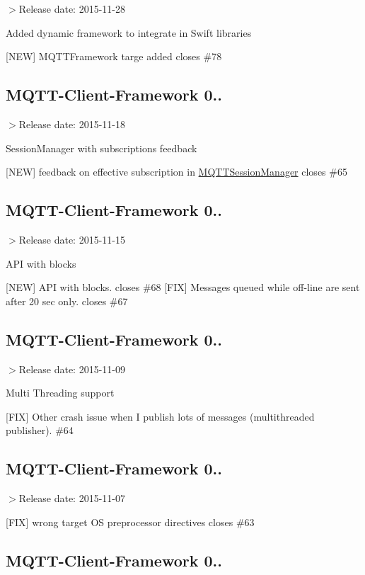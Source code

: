 $>$Release date\+: 2015-\/11-\/28

Added dynamic framework to integrate in Swift libraries

\mbox{[}N\+EW\mbox{]} M\+Q\+T\+T\+Framework targe added closes \#78

\subsection*{M\+Q\+T\+T-\/\+Client-\/\+Framework 0..}

$>$Release date\+: 2015-\/11-\/18

Session\+Manager with subscriptions feedback

\mbox{[}N\+EW\mbox{]} feedback on effective subscription in \hyperlink{interface_m_q_t_t_session_manager}{M\+Q\+T\+T\+Session\+Manager} closes \#65

\subsection*{M\+Q\+T\+T-\/\+Client-\/\+Framework 0..}

$>$Release date\+: 2015-\/11-\/15

A\+PI with blocks

\mbox{[}N\+EW\mbox{]} A\+PI with blocks. closes \#68 \mbox{[}F\+IX\mbox{]} Messages queued while off-\/line are sent after 20 sec only. closes \#67

\subsection*{M\+Q\+T\+T-\/\+Client-\/\+Framework 0..}

$>$Release date\+: 2015-\/11-\/09

Multi Threading support

\mbox{[}F\+IX\mbox{]} Other crash issue when I publish lots of messages (multithreaded publisher). \#64

\subsection*{M\+Q\+T\+T-\/\+Client-\/\+Framework 0..}

$>$Release date\+: 2015-\/11-\/07

\mbox{[}F\+IX\mbox{]} wrong target OS preprocessor directives closes \#63

\subsection*{M\+Q\+T\+T-\/\+Client-\/\+Framework 0..}

